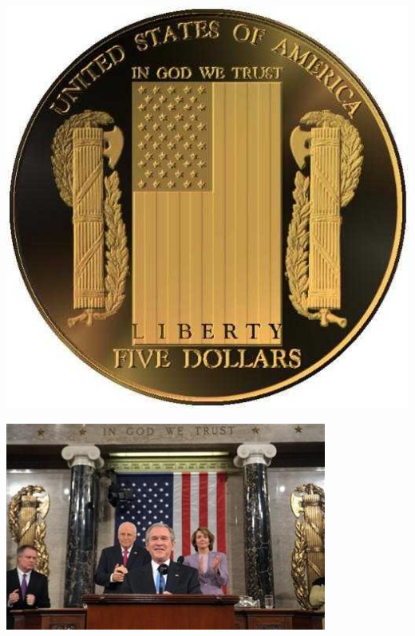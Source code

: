 \begin{frame}
    \centering
    \includegraphics[height=.8\textheight]{img/fasces/fasces5coin.jpg} \\
\end{frame}
\begin{frame}
    \centering
    \includegraphics[width=.9\textwidth]{img/fasces/fasces_congress.jpg} \\
\end{frame}
